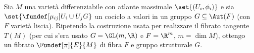 

\newcommand*\tc{\ \text{t.c.} \ } %


Sia $M$ una varietà differenziabile con atlante massimale $\set{(U_i, \phi_i)}$ e sia $\set{ \fundef[\mu_{ij}]{U_i \cup U_j}{G} }$ un cociclo a valori in un gruppo $G \subseteq \Aut(F)$ (con $F$ varietà liscia). Ripetendo la costruzione usata per realizzare il fibrato tangente $T(M)$ (per cui s'era usato $G = \GL(m, \R)$ e $F=\R^m$, $m = \dim M$), ottengo un fibrato $\Fundef[\pi]{E}{M}$ di fibra $F$ e gruppo strutturale $G$.
